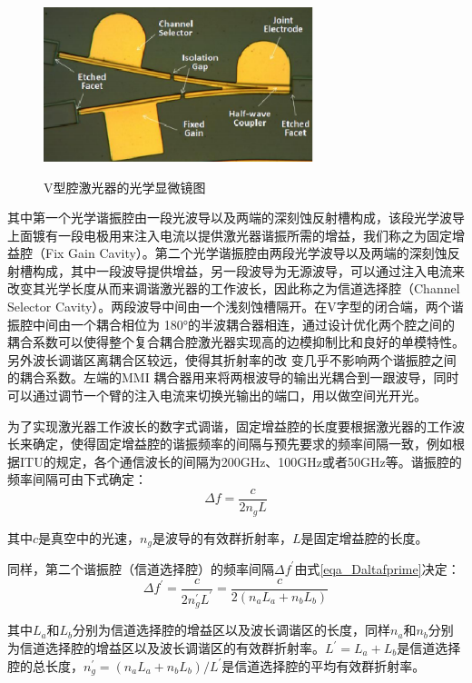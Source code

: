 \documentclass[oneside]{ZJUthesis}
\begin{document}
\begin{figure}[!h]
  \centering
  \includegraphics[width=0.7\textwidth]{./Pictures/vccl.eps}\\
  \caption{V型腔激光器的光学显微镜图\cite{jin201116-VCCL}}
  \label{fig_vccl}
\end{figure}

其中第一个光学谐振腔由一段光波导以及两端的深刻蚀反射槽构成，该段光学波导上面镀有一段电极用来注入电流以提供激光器谐振所需的增益，我们称之为固定增益腔（Fix Gain Cavity）。第二个光学谐振腔由两段光学波导以及两端的深刻蚀反射槽构成，其中一段波导提供增益，另一段波导为无源波导，可以通过注入电流来改变其光学长度从而来调谐激光器的工作波长，因此称之为信道选择腔（Channel Selector Cavity）。两段波导中间由一个浅刻蚀槽隔开。在V字型的闭合端，两个谐振腔中间由一个耦合相位为 180°的半波耦合器相连，通过设计优化两个腔之间的耦合系数可以使得整个复合耦合腔激光器实现高的边模抑制比和良好的单模特性。另外波长调谐区离耦合区较远，使得其折射率的改
变几乎不影响两个谐振腔之间的耦合系数。左端的MMI 耦合器用来将两根波导的输出光耦合到一跟波导，同时可以通过调节一个臂的注入电流来切换光输出的端口，用以做空间光开光。

为了实现激光器工作波长的数字式调谐，固定增益腔的长度要根据激光器的工作波长来确定，使得固定增益腔的谐振频率的间隔与预先要求的频率间隔一致，例如根据ITU的规定，各个通信波长的间隔为200GHz、100GHz或者50GHz等。谐振腔的频率间隔可由下式确定：
\begin{equation}
  \Delta f = \frac{c}{2 n_g L}
\end{equation}

其中$c$是真空中的光速，$n_g$是波导的有效群折射率，$L$是固定增益腔的长度。

同样，第二个谐振腔（信道选择腔）的频率间隔$\Delta f ^\prime$由式\ref{eqa_Daltafprime}决定：
\begin{equation}\label{eqa_Daltafprime}
  \Delta f ^\prime= \frac{c}{2 n_g^\prime L^\prime} = \frac{c}{2 (n_a L_a + n_b L_b)}
\end{equation}

其中$L_a$和$L_b$分别为信道选择腔的增益区以及波长调谐区的长度，同样$n_a$和$n_b$分别为信道选择腔的增益区以及波长调谐区的有效群折射率。$L^\prime=L_a+L_b$是信道选择腔的总长度，$n_g^\prime=(n_a L_a + n_b L_b)/L^\prime$是信道选择腔的平均有效群折射率。
\end{document}
